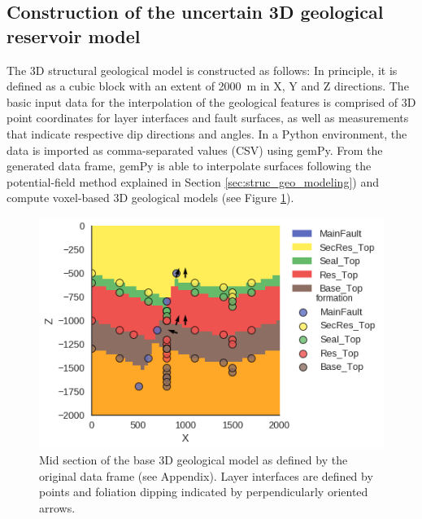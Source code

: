 		\subsection{Construction of the uncertain 3D geological reservoir model}\label{sec:3D_construction}
		The 3D structural geological model is constructed as follows: In principle, it is defined as a cubic block with an extent of 2000~m in X, Y and Z directions. The basic input data for the interpolation of the geological features is comprised of 3D point coordinates for layer interfaces and fault surfaces, as well as measurements that indicate respective dip directions and angles. In a Python environment, the data is imported as comma-separated values (CSV) using gemPy. From the generated data frame, gemPy is able to interpolate surfaces following the potential-field method explained in Section \ref{sec:struc_geo_modeling}) and compute voxel-based 3D geological models (see Figure \ref{fig:base3Dmodel_section}).
		
		\begin{figure}[h]
			\centering
			\includegraphics[width=1\textwidth]{Figures/base3Dmodel_plot.png}
			\caption{Mid section of the base 3D geological model as defined by the original data frame (see Appendix). Layer interfaces are defined by points and foliation dipping indicated by perpendicularly oriented arrows.}\label{fig:base3Dmodel_section}
		\end{figure}
		
